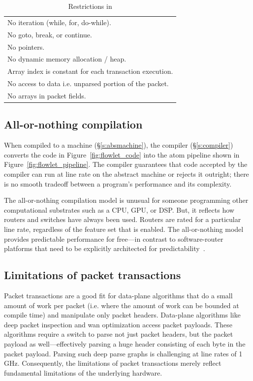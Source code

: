\begin{table}
  \begin{tabular}{p{}}
    No iteration (while, for, do-while).\\
    No goto, break, or continue.\\
    No pointers.\\
    No dynamic memory allocation / heap.\\
    Array index is constant for each transaction execution.\\
    No access to data i.e. unparsed portion of the packet.\\
    No arrays in packet fields.\\
  \end{tabular}
  \caption{Restrictions in \pktlanguage}
  \label{tab:restrict}
\end{table}

\subsection{All-or-nothing compilation}

When compiled to a \absmachine machine (\S\ref{s:absmachine}), the \pktlanguage
compiler (\S\ref{s:compiler}) converts the code in
Figure~\ref{fig:flowlet_code} into the atom pipeline shown in
Figure~\ref{fig:flowlet_pipeline}. The compiler guarantees that code accepted
by the compiler can run at line rate on the abstract machine or rejects it
outright; there is no smooth tradeoff between a program's performance and its
complexity.

The all-or-nothing compilation model is unusual for someone programming other
computational substrates such as a CPU, GPU, or DSP. But, it reflects how
routers and switches have always been used. Routers are rated for a particular
line rate, regardless of the feature set that is enabled. The all-or-nothing
model provides predictable performance for free---in contrast to
software-router platforms that need to be explicitly architected for
predictability~\cite{dobrescu2012, wenfei15}.

\subsection{Limitations of packet transactions}

Packet transactions are a good fit for data-plane algorithms that do a small
amount of work per packet (i.e. where the amount of work can be bounded at
compile time) and manipulate only packet headers. Data-plane algorithms like
deep packet inspection and wan optimization access packet payloads. These
algorithms require a switch to parse not just packet headers, but the packet
payload as well---effectively parsing a huge header consisting of each byte in
the packet payload. Parsing such deep parse graphs is challenging at line rates
of 1 GHz. Consequently, the limitations of packet transactions merely reflect
fundamental limitations of the underlying hardware.
